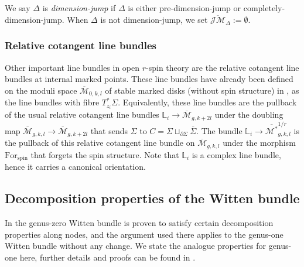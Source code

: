 \documentclass[11pt,a4paper]{article}
\theoremstyle{definition}
\theoremstyle{remark}
\newcommand{\oJMb}{{\overline{\mathcal{JM}}}}
\numberwithin{equation}{section}
\def\Mbar{{\overline{\mathcal M}}}
\def\Mbarstar{{\overline{\mathcal M^*}}}
\begin{document}
We say $\Delta$ is \textit{dimension-jump} if $\Delta$ is either pre-dimension-jump or completely-dimension-jump. When $\Delta$ is not dimension-jump, we set $\oJMb_\Delta:=\emptyset$.



  

\subsubsection{Relative cotangent line bundles}
Other important line bundles in open $r$-spin theory are the relative cotangent line bundles at internal marked points.  These line bundles have already been defined on the moduli space $\Mbar_{0,k,l}$ of stable marked disks (without spin structure) in \cite{PST14}, as the line bundles with fibre $T^*_{z_i}\Sigma$. Equivalently, these line bundles are the pullback of the usual relative cotangent line bundles ${\mathbb{L}}_i\to\Mbar_{g,k+2l}$ under the doubling map $\Mbar_{g,k,l} \to \Mbar_{g,k+2l}$ that sends $\Sigma$ to $C=\Sigma\sqcup_{\partial\Sigma}\overline{\Sigma}$.  The bundle $\mathbb{L}_i\to\Mbarstar_{g,k,l}^{1/r}$ is the pullback of this relative cotangent line bundle on $\Mbar_{g,k,l}$ under the morphism $\text{For}_{\text{spin}}$ that forgets the spin structure.  Note that $\mathbb{L}_i$ is a complex line bundle, hence it carries a canonical orientation. 


\subsection*{Decomposition properties of the Witten bundle}

  
In \cite{BCT1} the genus-zero Witten bundle is proven to satisfy certain decomposition properties along nodes, and the argument used there applies to the genus-one Witten bundle without any change.  We state the analogue properties for genus-one here, further details and proofs can be found in \cite[Section 4.2]{BCT1}.
\end{document}
